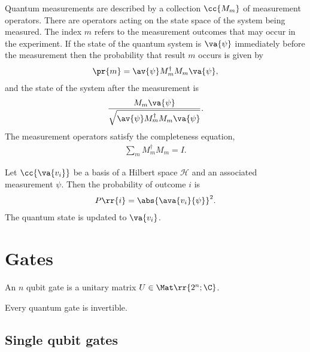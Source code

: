 \documentclass{article}
\begin{document}
\begin{axiom}
  Quantum measurements are described by a collection $\cc{M_m}$ of measurement operators.
  There are operators acting on the state space of the system being measured. The index $m$
  refers to the measurement outcomes that may occur in the experiment. If the state of the
  quantum system is $\va{\psi}$ immediately before the measurement then the probability
  that result $m$ occurs is given by
  \begin{align*}
    \pr{m}=\av{\psi}M_m^\dagger M_m \va{\psi},
  \end{align*}
  and the state of the system after the measurement is
  \begin{align*}
    \frac{M_m \va{\psi}}{\sqrt{\av{\psi}M_m^\dagger M_m \va{\psi}}}.
  \end{align*}
  The measurement operators satisfy the completeness equation,
  \begin{align*}
    \sum_{m} M_m^\dagger M_m = I.
  \end{align*}
\end{axiom}

\begin{theorem}
  \label{thm:probability-of-outcome}
  Let $\cc{\va{v_i}}$ be a basis of a Hilbert space $\mathcal{H}$ and an associated measurement $\psi$.
  Then the probability of outcome $i$ is
  \begin{align*}
    P\rr{i} = \abs{\ava{v_i}{\psi}}^2.
  \end{align*}
  The quantum state is updated to $\va{v_i}$.
\end{theorem}

\section{Gates}
\label{sec:gates}

\begin{definition}
  \label{def:single-qubit-gates}
  An $n$ qubit gate is a unitary matrix $U\in\Mat\rr{2^n;\C}$.
\end{definition}

\begin{corollary}
  Every quantum gate is invertible.
\end{corollary}

\subsection{Single qubit gates}
\label{sec:single-qubit-gates}
\end{document}
